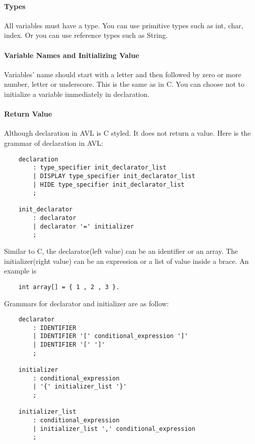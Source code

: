 \paragraph{Types}
All variables must have a type. You can use primitive types such as int, char, index. Or you can use
reference types such as String.

\paragraph{Variable Names and Initializing Value}
Variables’ name should start with a letter and then followed by zero or more number, letter or
underscore. This is the same as in C. You can choose not to initialize a variable immediately in
declaration.

\paragraph{Return Value}
Although declaration in AVL is C styled. It does not return a value.  Here is the grammar of
declaration in AVL:

\begin{verbatim}
    declaration
        : type_specifier init_declarator_list
        | DISPLAY type_specifier init_declarator_list
        | HIDE type_specifier init_declarator_list
        ;

    init_declarator
        : declarator
        | declarator '=' initializer
        ;
\end{verbatim}

Similar to C, the declarator(left value) can be an identifier or an array. The initializer(right
value) can be an expression or a list of value inside a brace. An example is

\begin{verbatim}
    int array[] = { 1 , 2 , 3 }.
\end{verbatim}

Grammars for declarator and initializer are as follow:

\begin{verbatim}
    declarator
        : IDENTIFIER
        | IDENTIFIER '[' conditional_expression ']'
        | IDENTIFIER '[' ']'
        ;

    initializer
        : conditional_expression
        | '{' initializer_list '}'
        ;

    initializer_list
        : conditional_expression
        | initializer_list ',' conditional_expression
        ;
\end{verbatim}

